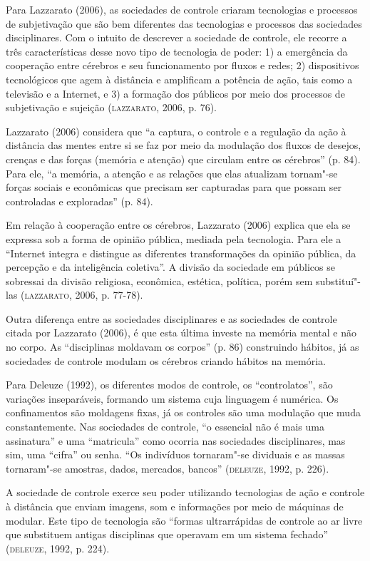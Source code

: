 Para Lazzarato (2006), as sociedades de controle criaram tecnologias e
processos de subjetivação que são bem diferentes das tecnologias e
processos das sociedades disciplinares. Com o intuito de descrever a
sociedade de controle, ele recorre a três características desse novo
tipo de tecnologia de poder: 1) a emergência da cooperação entre
cérebros e seu funcionamento por fluxos e redes; 2) dispositivos
tecnológicos que agem à distância e amplificam a potência de ação, tais
como a televisão e a Internet, e 3) a formação dos públicos por meio dos
processos de subjetivação e sujeição (\textsc{lazzarato}, 2006, p. 76).

Lazzarato (2006) considera que ``a captura, o controle e a regulação da
ação à distância das mentes entre si se faz por meio da modulação dos
fluxos de desejos, crenças e das forças (memória e atenção) que circulam
entre os cérebros'' (p. 84). Para ele, ``a memória, a atenção e as
relações que elas atualizam tornam"-se forças sociais e econômicas que
precisam ser capturadas para que possam ser controladas e exploradas''
(p. 84).

Em relação à cooperação entre os cérebros, Lazzarato (2006) explica que
ela se expressa sob a forma de opinião pública, mediada pela tecnologia.
Para ele a ``Internet integra e distingue as diferentes transformações
da opinião pública, da percepção e da inteligência coletiva''. A divisão
da sociedade em públicos se sobressai da divisão religiosa, econômica,
estética, política, porém sem substituí"-las (\textsc{lazzarato}, 2006, p. 77-78).

Outra diferença entre as sociedades disciplinares e as sociedades de
controle citada por Lazzarato (2006), é que esta última investe na
memória mental e não no corpo. As ``disciplinas moldavam os corpos''
(p. 86) construindo hábitos, já as sociedades de controle modulam os
cérebros criando hábitos na memória.

Para Deleuze (1992), os diferentes modos de controle, os
``controlatos'', são variações inseparáveis, formando um sistema cuja
linguagem é numérica. Os confinamentos são moldagens fixas, já os
controles são uma modulação que muda constantemente. Nas sociedades de
controle, ``o essencial não é mais uma assinatura'' e uma ``matricula''
como ocorria nas sociedades disciplinares, mas sim, uma ``cifra'' ou
senha. ``Os indivíduos tornaram"-se dividuais e as massas tornaram"-se
amostras, dados, mercados, bancos'' (\textsc{deleuze}, 1992, p. 226).

A sociedade de controle exerce seu poder utilizando tecnologias de ação
e controle à distância que enviam imagens, som e informações por meio de
máquinas de modular. Este tipo de tecnologia são ``formas ultrarrápidas
de controle ao ar livre que substituem antigas disciplinas que operavam
em um sistema fechado'' (\textsc{deleuze}, 1992, p. 224).

